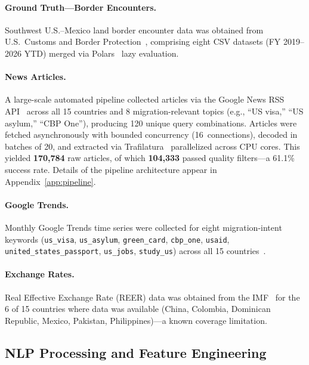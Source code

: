 \documentclass[11pt, a4paper]{article}
\begin{document}
\paragraph{Ground Truth---Border Encounters.}
Southwest U.S.--Mexico land border encounter data was obtained from U.S.\ Customs and
Border Protection~\citep{cbp_encounters}, comprising eight CSV datasets (FY 2019--2026
YTD) merged via Polars~\citep{polars} lazy evaluation.

\paragraph{News Articles.}
A large-scale automated pipeline collected articles via the Google News RSS
API~\citep{google_news} across all 15 countries and 8 migration-relevant topics (e.g.,
``US visa,'' ``US asylum,'' ``CBP One''), producing 120 unique query combinations.
Articles were fetched asynchronously with bounded concurrency (16~connections), decoded
in batches of 20, and extracted via Trafilatura~\citep{trafilatura} parallelized across
CPU cores.  This yielded \textbf{170,784} raw articles, of which \textbf{104,333}
passed quality filters---a 61.1\% success rate.  Details of the pipeline architecture
appear in Appendix~\ref{app:pipeline}.

\paragraph{Google Trends.}
Monthly Google Trends time series were collected for eight migration-intent
keywords (\texttt{us\_visa}, \texttt{us\_asylum}, \texttt{green\_card},
\texttt{cbp\_one}, \texttt{usaid}, \texttt{united\_states\_passport},
\texttt{us\_jobs}, \texttt{study\_us}) across all 15 countries~\citep{google_trends}.

\paragraph{Exchange Rates.}
Real Effective Exchange Rate (REER) data was obtained from the
IMF~\citep{imf_reer} for the 6 of 15 countries where data was available (China,
Colombia, Dominican Republic, Mexico, Pakistan, Philippines)---a known coverage
limitation.


\subsection{NLP Processing and Feature Engineering}
\end{document}
